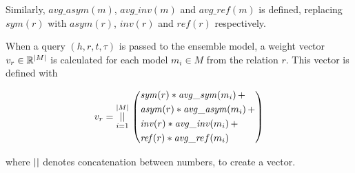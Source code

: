 \noindent
Similarly, $\mathit{avg\_asym}(m)$, $\mathit{avg\_inv}(m)$ and $\mathit{avg\_ref}(m)$ is defined, replacing $\mathit{sym}(r)$ with $\mathit{asym}(r)$, $\mathit{inv}(r)$ and $\mathit{ref}(r)$ respectively.

When a query $(h, r, t, \tau)$ is passed to the ensemble model, a weight vector $v_r \in \mathbb{R}^{|M|}$ is calculated for each model $m_i \in M$ from the relation $r$. This vector is defined with

\begin{equation}
v_r = \operatorname*{||}\limits_{i = 1}^{|M|} \, \left(
\begin{aligned}
&\mathit{sym}(r) * \mathit{avg\_sym}(m_i) \, + \\
&\mathit{asym}(r) * \mathit{avg\_asym}(m_i) \, + \\
&\mathit{inv}(r) * \mathit{avg\_inv}(m_i) \, + \\
&\mathit{ref}(r) * \mathit{avg\_re}f(m_i)
\end{aligned} \right)
\end{equation}

\noindent
where $\operatorname*{||}$ denotes concatenation between numbers, to create a vector.